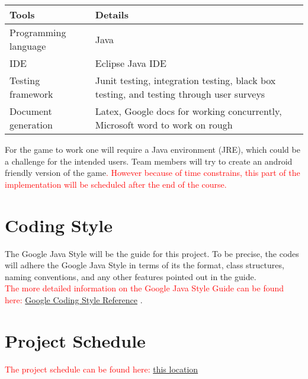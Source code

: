 \documentclass{article}
\begin{document}
\begin{tabular}{|p{5cm}|p{8cm}|}
\hline
\textbf{Tools}    & \textbf{Details}                                                                                                                                                                                                                                                                                                                                                                                                                                \\\hline
Programming language       & Java\\\hline
IDE      & Eclipse Java IDE\\\hline
Testing framework       & Junit testing, integration testing, black box testing, and testing through user surveys \\\hline
Document generation   & Latex, Google docs for working concurrently, Microsoft word to work on rough \\\hline
\end{tabular}\bigskip

For the game to work one will require a Java environment (JRE), which could be a challenge for the intended users. Team members will try to create an android friendly version of the game\textcolor{red}{. However because of time constrains, this part of 
the implementation will be scheduled after the end of the course.} \\

\section {Coding Style}
The Google Java Style will be the guide for this project. To be precise, the codes will adhere the Google Java Style in terms of its the format, class structures, naming conventions, and any other features pointed out in the guide.\\

\textcolor{red}{The more detailed information on the Google Java Style Guide can be found here:} \href{https://google.github.io/styleguide/javaguide.html}{Google Coding Style Reference} . \\


\section {Project Schedule}

\textcolor{red}{The project schedule can be found here: }\href{run:../../ProjectSchedule/GanttChart.gan}{this location} \\
\end{document}
